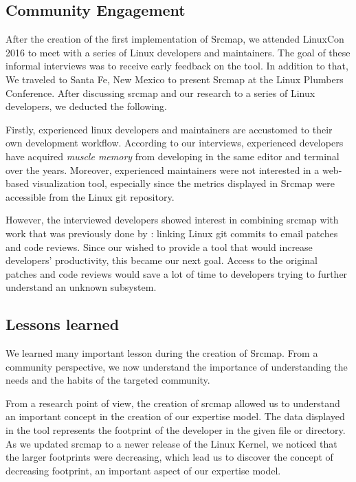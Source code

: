 \subsection{Community Engagement}

After the creation of the first implementation of Srcmap, we attended LinuxCon 2016 to meet with a series of Linux developers and maintainers. The goal of these informal interviews was to receive early feedback on the tool. In addition to that, We traveled to Santa Fe, New Mexico to present Srcmap at the Linux Plumbers Conference. After discussing srcmap and our research to a series of Linux developers, we deducted the following. 

Firstly, experienced linux developers and maintainers are accustomed to their own development workflow. According to our interviews, experienced developers have acquired \textit{muscle memory} from developing in the same editor and terminal over the years. Moreover, experienced maintainers were not interested in a web-based visualization tool, especially since the metrics displayed in Srcmap were accessible from the Linux git repository. 

However, the interviewed developers showed interest in combining srcmap with work that was previously done by \cite{jiang14}: linking Linux git commits to email patches and code reviews. Since our wished to provide a tool that would increase developers' productivity, this became our next goal. Access to the original patches and code reviews would save a lot of time to developers trying to further understand an unknown subsystem. 



\subsection{Lessons learned}
\label{sec:lessons_srcmap}

We learned many important lesson during the creation of Srcmap.  From a community perspective, we now understand the importance of understanding the needs and the habits of the targeted community. 


From a research point of view, the creation of srcmap allowed us to understand an important concept in the creation of our expertise model. The data displayed in the tool represents the footprint of the developer in the given file or directory. As we updated srcmap to a newer release of the Linux Kernel, we noticed that the larger footprints were decreasing, which lead us to discover the concept of decreasing footprint, an important aspect of our expertise model. 


